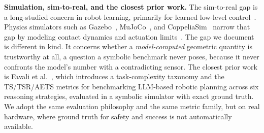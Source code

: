 \textbf{Simulation, sim-to-real, and the closest prior work.} The
sim-to-real gap is a long-studied concern in robot learning, primarily
for learned low-level control~\cite{zhao2020simtoreal}. Physics
simulators such as Gazebo~\cite{koenig2004gazebo},
MuJoCo~\cite{todorov2012mujoco}, and
CoppeliaSim~\cite{rohmer2013coppeliasim} narrow that gap by modeling
contact dynamics and actuation limits~\cite{collins2021physics}. The
gap we document is different in kind. It concerns whether a
\emph{model-computed} geometric quantity is trustworthy at all, a
question a symbolic benchmark never poses, because it never confronts
the model's number with a contradicting sensor. The closest prior work
is Favali et al.~\cite{favaliRAS}, which introduces a task-complexity
taxonomy and the TS/TSR/AETS metrics for benchmarking LLM-based robotic
planning across six reasoning strategies, evaluated in a symbolic
simulator with exact ground truth. We adopt the same evaluation
philosophy and the same metric family, but on real hardware, where
ground truth for safety and success is not automatically available.
